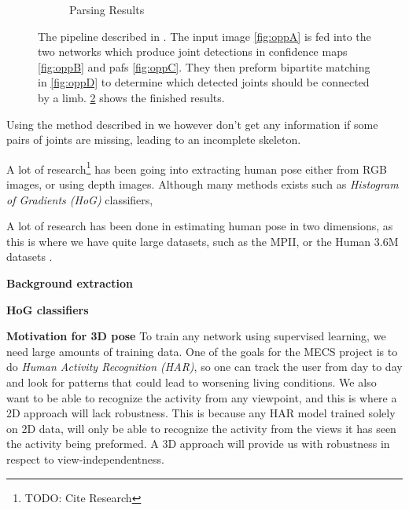 \begin{figure}[t!]
\begin{subfigure}[t]{0.24\textwidth}
    \label{fig:oppE}
    \caption{Parsing Results}
  \end{subfigure}
  \caption{The pipeline described in \cite{cao2017realtime}. The input image \ref{fig:oppA} is fed into the two networks which produce joint detections in confidence maps \ref{fig:oppB} and \gls{paf}s \ref{fig:oppC}. They then preform bipartite matching in \ref{fig:oppD} to determine which detected joints should be connected by a limb. \ref{fig:oppE} shows the finished results.}
\end{figure}

Using the method described in \cite{cao2017realtime} we however don't get any information if some pairs of joints are missing, leading to an incomplete skeleton. 


A lot of research\footnote{TODO: Cite Research} has been going into extracting human pose either from RGB images, or using depth images. Although many methods exists such as \emph{Histogram of Gradients (HoG)} classifiers,

A lot of research has been done in estimating human pose in two dimensions, as this is where we have quite large datasets, such as the MPII, or the Human 3.6M datasets \cite{andriluka14cvpr,h36m_pami}.

\textbf{Background extraction}

\textbf{HoG classifiers}


\textbf{Motivation for 3D pose} To train any network using supervised learning, we need large amounts of training data. One of the goals for the MECS project is to do \emph{Human Activity Recognition (HAR)}, so one can track the user from day to day and look for patterns that could lead to worsening living conditions. We also want to be able to recognize the activity from any viewpoint, and this is where a 2D approach will lack robustness. This is because any HAR model trained solely on 2D data, will only be able to recognize the activity from the views it has seen the activity being preformed. A 3D approach will provide us with robustness in respect to view-independentness.


